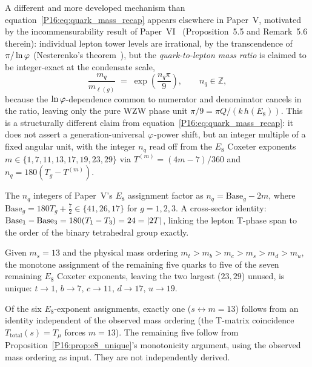 A different and more developed mechanism than
equation~\eqref{P16:eq:quark_mass_recap} appears elsewhere in Paper~V,
motivated by the incommensurability result of Paper~VI~\cite{Paper6}
(Proposition~5.5 and Remark~5.6 therein): individual lepton tower
levels are irrational, by the transcendence of $\pi/\ln\varphi$
(Nesterenko's theorem~\cite{Nesterenko1996}), but the
\emph{quark-to-lepton mass ratio} is claimed to be integer-exact at
the condensate scale,
\begin{equation}
  \frac{m_q}{m_{\ell(g)}} \;=\; \exp\!\left(\frac{n_q\pi}{9}\right),
  \qquad n_q\in\mathbb{Z},
  \label{P16:eq:e8_ratio_recap}
\end{equation}
because the $\ln\varphi$-dependence common to numerator and denominator
cancels in the ratio, leaving only the pure WZW phase unit
$\pi/9=\pi Q/(k\,h(E_8))$. This is a structurally different claim from
equation~\eqref{P16:eq:quark_mass_recap}: it does not assert a
generation-universal $\varphi$-power shift, but an integer multiple of a
fixed angular unit, with the integer $n_q$ read off from the $E_8$
Coxeter exponents $m\in\{1,7,11,13,17,19,23,29\}$ via
$T^{(m)}=(4m-7)/360$ and $n_q=180(T_g-T^{(m)})$.

\begin{remark}
\label{P16:rem:nq_structure}
The $n_q$ integers of Paper~V's $E_8$ assignment factor as
$n_q = \mathrm{Base}_g - 2m$, where
$\mathrm{Base}_g=180T_g+\tfrac{7}{2}\in\{41,26,17\}$ for $g=1,2,3$.
A cross-sector identity: $\mathrm{Base}_1 - \mathrm{Base}_3
= 180(T_1-T_3) = 24 = |2T|$, linking the lepton T-phase span to the
order of the binary tetrahedral group exactly.
\end{remark}

\begin{proposition}
\label{P16:prop:e8_unique}
Given $m_s=13$ and the physical mass ordering
$m_t>m_b>m_c>m_s>m_d>m_u$, the monotone assignment of the remaining
five quarks to five of the seven remaining $E_8$ Coxeter exponents,
leaving the two largest ($23,29$) unused, is unique:
$t\to1,\,b\to7,\,c\to11,\,d\to17,\,u\to19$.
\end{proposition}

\begin{proposition}
\label{P16:prop:e8_mixed}
Of the six $E_8$-exponent assignments, exactly one ($s\leftrightarrow m=13$)
follows from an identity independent of the observed mass ordering (the
T-matrix coincidence $T_{\mathrm{total}}(s)=T_\mu$ forces $m=13$). The
remaining five follow from Proposition~\ref{P16:prop:e8_unique}'s monotonicity
argument, using the observed mass ordering as input. They are not
independently derived.
\end{proposition}

